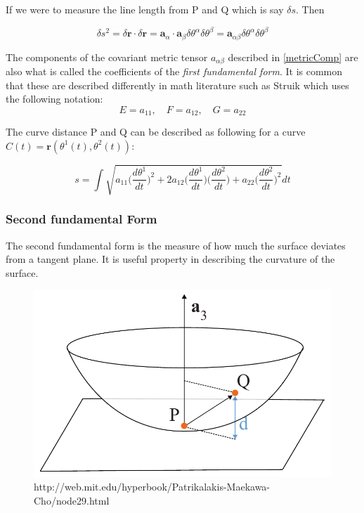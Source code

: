 If we were to measure the line length from P and Q which is say $\delta s$. Then 

\begin{equation}
\delta s^2 = \delta \textbf{r} \cdot \delta \textbf{r} =  \textbf{a}_\alpha \cdot \textbf{a}_\beta \delta\theta^\alpha \delta\theta^\beta =  \textbf{a}_{\alpha\beta} \delta\theta^\alpha \delta\theta^\beta 
\end{equation}

The components of the covariant metric tensor $a_{\alpha \beta}$ described in \ref{metricComp} are also what is called the coefficients of the \textit{first fundamental form}.
It is common that these are described differently in math literature such as Struik which uses the following notation:
$$ E= a_{11} ,\quad  F = a_{12},\quad
 G = a_{22}$$

The curve distance P and Q can be described as following for a curve $ \textit{C}(t) = \textbf{r}(\theta^1(t),\theta^2(t))$:

$$s = \int { \sqrt { a_{11} \Big(\frac{d\theta^1 }{dt}\Big)^2+2a_{12}\Big(\frac{d\theta^1 }{dt}\Big)\Big(\frac{d\theta^2 }{dt}\Big)  +a_{22} \Big(\frac{d\theta^2 }{dt}\Big)^2 }  } dt$$



\subsubsection{Second fundamental Form}

The second fundamental form is the measure of how much the surface deviates from a tangent plane.\cite{ref:Stoker} It is useful property in describing the curvature of the surface.

\begin{figure}[H]
\centering
\includegraphics[width = 0.7\linewidth ]{figure/Theory/SecondFFil.pdf}
\caption{http://web.mit.edu/hyperbook/Patrikalakis-Maekawa-Cho/node29.html}
\end{figure}

